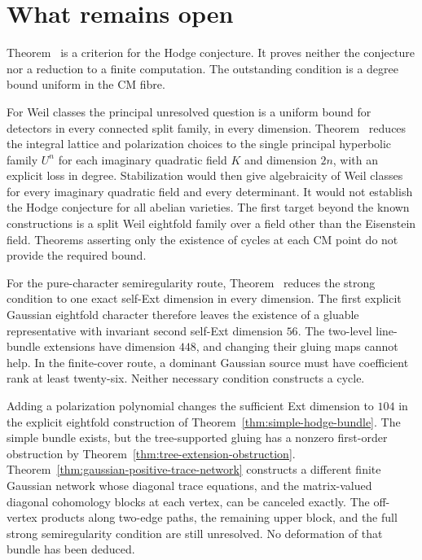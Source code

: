 \documentclass[11pt]{article}
\theoremstyle{definition}
\theoremstyle{remark}
\begin{document}
\section{What remains open}
\label{sec:open}
Theorem~ is a criterion for the Hodge conjecture. It proves neither the conjecture nor a reduction to a finite computation. The outstanding condition is a degree bound uniform in the CM fibre.

For Weil classes the principal unresolved question is a uniform bound for detectors in every connected split family, in every dimension. Theorem~ reduces the integral lattice and polarization choices to the single principal hyperbolic family $U^n$ for each imaginary quadratic field $K$ and dimension $2n$, with an explicit loss in degree. Stabilization would then give algebraicity of Weil classes for every imaginary quadratic field and every determinant. It would not establish the Hodge conjecture for all abelian varieties. The first target beyond the known constructions is a split Weil eightfold family over a field other than the Eisenstein field. Theorems asserting only the existence of cycles at each CM point do not provide the required bound.

For the pure-character semiregularity route, Theorem~ reduces the strong condition to one exact self-Ext dimension in every dimension. The first explicit Gaussian eightfold character therefore leaves the existence of a gluable representative with invariant second self-Ext dimension $56$. The two-level line-bundle extensions have dimension $448$, and changing their gluing maps cannot help. In the finite-cover route, a dominant Gaussian source must have coefficient rank at least twenty-six. Neither necessary condition constructs a cycle.

Adding a polarization polynomial changes the sufficient Ext dimension
to $104$ in the explicit eightfold construction of
Theorem~\ref{thm:simple-hodge-bundle}.
The simple bundle exists, but the tree-supported gluing has a
nonzero first-order obstruction by
Theorem~\ref{thm:tree-extension-obstruction}.
Theorem~\ref{thm:gaussian-positive-trace-network} constructs a different
finite Gaussian network whose diagonal trace equations, and the
matrix-valued diagonal cohomology blocks at each vertex, can be
canceled exactly.  The off-vertex products along two-edge paths,
the remaining upper block, and the full strong semiregularity
condition are still unresolved.  No deformation of that bundle
has been deduced.
\end{document}
